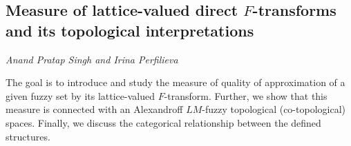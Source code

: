 \documentclass[../booklet.tex]{subfiles}
\begin{document}
\subsection[Measure of lattice-valued direct $F$-transforms and its topological interpretations. {\it Anand Pratap Singh and Irina Perfilieva}]{Measure of lattice-valued direct $F$-transforms and its topological interpretations}
 

\begin{center}
  {\it Anand Pratap Singh and Irina Perfilieva}
\end{center}

\vskip 0.8cm


		The goal is to introduce and study the measure of quality of approximation of a given fuzzy set by its lattice-valued $F$-transform. Further, we show that this measure is connected with an Alexandroff $LM$-fuzzy topological (co-topological) spaces. Finally, we discuss the categorical relationship between the defined structures.
		
	
\end{document}
